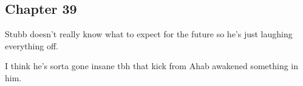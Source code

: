 \subsection{Chapter 39}

Stubb doesn't really know what to expect for the future so he's just laughing
everything off.

I think he's sorta gone insane tbh that kick from Ahab awakened something in him.
